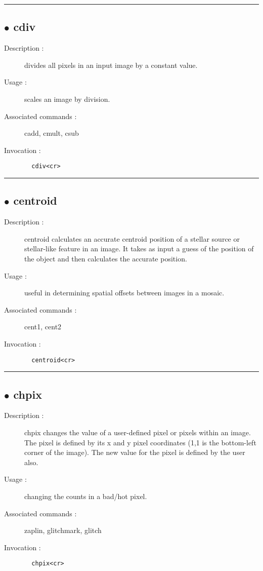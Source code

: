 \hrule \subsection*{$\bullet$ cdiv}
\begin{description}
\item[Description :] divides all pixels in an input image by a constant value. 
\item[Usage :] scales an image by division.
\item[Associated commands :] cadd, cmult, csub
\item[Invocation :]

\verb+  cdiv<cr> +\end{description}

\hrule \subsection*{$\bullet$ centroid}
\begin{description}
\item[Description :] centroid calculates an accurate centroid position of a stellar
source or stellar-like feature in an image.  It takes as input a guess of
the position of the object and then calculates the accurate position.
\item[Usage :] useful in determining spatial offsets between images in a mosaic.
\item[Associated commands :] cent1, cent2
\item[Invocation :]

\verb+  centroid<cr> +\end{description}

\hrule \subsection*{$\bullet$ chpix}
\begin{description}
\item[Description :] chpix changes the value of a user-defined pixel or pixels within
an image.  The pixel is defined by its x and y pixel coordinates (1,1 is
the bottom-left corner of the image).  The new value for the pixel is
defined by the user also.
\item[Usage :] changing the counts in a bad/hot pixel.
\item[Associated commands :] zaplin, glitchmark, glitch
\item[Invocation :]

\verb+  chpix<cr> +\end{description}

